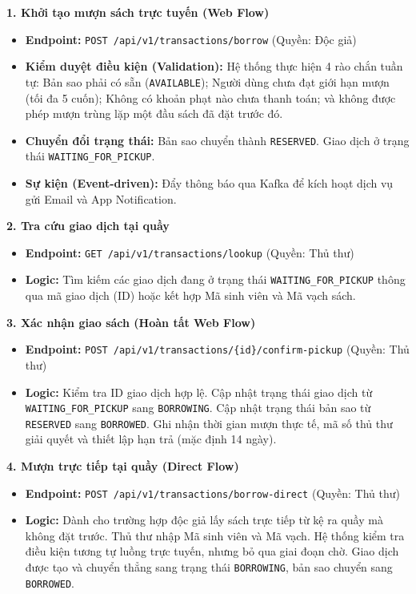 \noindent\textbf{1. Khởi tạo mượn sách trực tuyến (Web Flow)}
\begin{itemize}
    \item \textbf{Endpoint:} \texttt{POST /api/v1/transactions/borrow} (Quyền: Độc giả)
    \item \textbf{Kiểm duyệt điều kiện (Validation):} 
    Hệ thống thực hiện 4 rào chắn tuần tự: Bản sao phải có sẵn (\texttt{AVAILABLE}); Người dùng chưa đạt giới hạn mượn (tối đa 5 cuốn); Không có khoản phạt nào chưa thanh toán; và không được phép mượn trùng lặp một đầu sách đã đặt trước đó.
    \item \textbf{Chuyển đổi trạng thái:} Bản sao chuyển thành \texttt{RESERVED}. Giao dịch ở trạng thái \texttt{WAITING\_FOR\_PICKUP}.
    \item \textbf{Sự kiện (Event-driven):} Đẩy thông báo qua Kafka để kích hoạt dịch vụ gửi Email và App Notification.
\end{itemize}

\noindent\textbf{2. Tra cứu giao dịch tại quầy}
\begin{itemize}
    \item \textbf{Endpoint:} \texttt{GET /api/v1/transactions/lookup} (Quyền: Thủ thư)
    \item \textbf{Logic:} Tìm kiếm các giao dịch đang ở trạng thái \texttt{WAITING\_FOR\_PICKUP} thông qua mã giao dịch (ID) hoặc kết hợp Mã sinh viên và Mã vạch sách.
\end{itemize}

\noindent\textbf{3. Xác nhận giao sách (Hoàn tất Web Flow)}
\begin{itemize}
    \item \textbf{Endpoint:} \texttt{POST /api/v1/transactions/\{id\}/confirm-pickup} (Quyền: Thủ thư)
    \item \textbf{Logic:} Kiểm tra ID giao dịch hợp lệ. Cập nhật trạng thái giao dịch từ \texttt{WAITING\_FOR\_PICKUP} sang \texttt{BORROWING}. Cập nhật trạng thái bản sao từ \texttt{RESERVED} sang \texttt{BORROWED}. Ghi nhận thời gian mượn thực tế, mã số thủ thư giải quyết và thiết lập hạn trả (mặc định 14 ngày).
\end{itemize}

\noindent\textbf{4. Mượn trực tiếp tại quầy (Direct Flow)}
\begin{itemize}
    \item \textbf{Endpoint:} \texttt{POST /api/v1/transactions/borrow-direct} (Quyền: Thủ thư)
    \item \textbf{Logic:} Dành cho trường hợp độc giả lấy sách trực tiếp từ kệ ra quầy mà không đặt trước. Thủ thư nhập Mã sinh viên và Mã vạch. Hệ thống kiểm tra điều kiện tương tự luồng trực tuyến, nhưng bỏ qua giai đoạn chờ. Giao dịch được tạo và chuyển thẳng sang trạng thái \texttt{BORROWING}, bản sao chuyển sang \texttt{BORROWED}.
\end{itemize}




















